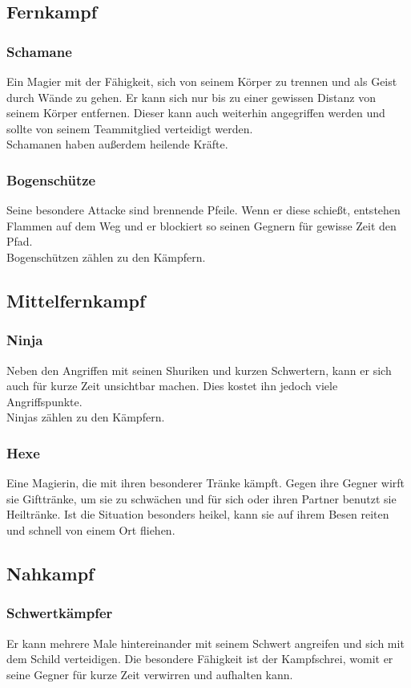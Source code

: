 \documentclass[10pt,a4paper,notitlepage]{report}
\begin{document}
\begin{flushleft}
\subsection{Fernkampf}
\subsubsection{Schamane}
Ein Magier mit der Fähigkeit, sich von seinem Körper zu trennen und als Geist durch Wände zu gehen. Er kann sich nur bis zu einer gewissen Distanz von seinem Körper entfernen. Dieser kann auch weiterhin angegriffen werden und sollte von seinem Teammitglied verteidigt werden.\\
Schamanen haben außerdem heilende Kräfte.\\
\subsubsection{Bogenschütze}
Seine besondere Attacke sind brennende Pfeile. Wenn er diese schießt, entstehen Flammen auf dem Weg und er blockiert so seinen Gegnern für gewisse Zeit den Pfad.\\
Bogenschützen zählen zu den Kämpfern.\\
\subsection{Mittelfernkampf}
\subsubsection{Ninja}
Neben den Angriffen mit seinen Shuriken und kurzen Schwertern, kann er sich auch für kurze Zeit unsichtbar machen. Dies kostet ihn jedoch viele Angriffspunkte.\\
Ninjas zählen zu den Kämpfern.\\
\subsubsection{Hexe}
Eine Magierin, die mit ihren besonderer Tränke kämpft. Gegen ihre Gegner wirft sie Gifttränke, um sie zu schwächen und für sich oder ihren Partner benutzt sie Heiltränke. Ist die Situation besonders heikel, kann sie auf ihrem Besen reiten und schnell von einem Ort fliehen.\\
\subsection{Nahkampf}
\subsubsection{Schwertkämpfer}
Er kann mehrere Male hintereinander mit seinem Schwert angreifen und sich mit dem Schild verteidigen. Die besondere Fähigkeit ist der Kampfschrei, womit er seine Gegner für kurze Zeit verwirren und aufhalten kann.\\

\end{flushleft}
\end{document}
